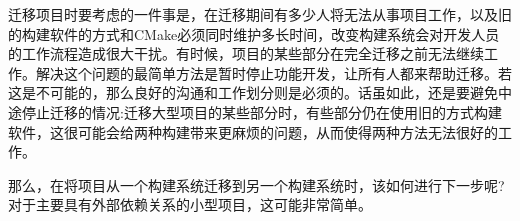 迁移项目时要考虑的一件事是，在迁移期间有多少人将无法从事项目工作，以及旧的构建软件的方式和CMake必须同时维护多长时间，改变构建系统会对开发人员的工作流程造成很大干扰。有时候，项目的某些部分在完全迁移之前无法继续工作。解决这个问题的最简单方法是暂时停止功能开发，让所有人都来帮助迁移。若这是不可能的，那么良好的沟通和工作划分则是必须的。话虽如此，还是要避免中途停止迁移的情况:迁移大型项目的某些部分时，有些部分仍在使用旧的方式构建软件，这很可能会给两种构建带来更麻烦的问题，从而使得两种方法无法很好的工作。

那么，在将项目从一个构建系统迁移到另一个构建系统时，该如何进行下一步呢?对于主要具有外部依赖关系的小型项目，这可能非常简单。





















